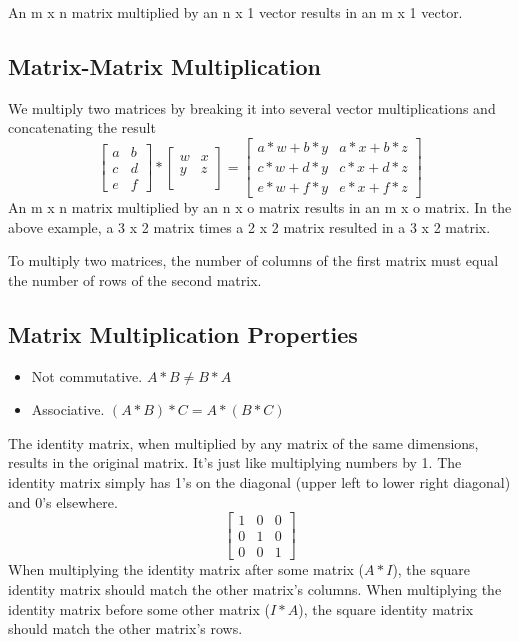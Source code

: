 An m x n matrix multiplied by an n x 1 vector results in an m x 1 vector.

\subsection{Matrix-Matrix Multiplication}
We multiply two matrices by breaking it into several vector multiplications and concatenating the result
\[
\begin{bmatrix}  a & b \\   c & d \\   e & f \end{bmatrix} *\begin{bmatrix}  w & x \\   y & z \\  \end{bmatrix} =\begin{bmatrix}  a*w + b*y & a*x + b*z \\   c*w + d*y & c*x + d*z \\   e*w + f*y & e*x + f*z\end{bmatrix}
\]
An m x n matrix multiplied by an n x o matrix results in an m x o matrix. In the above example, a 3 x 2 matrix times a 2 x 2 matrix resulted in a 3 x 2 matrix.

To multiply two matrices, the number of columns of the first matrix must equal the number of rows of the second matrix.
\subsection{Matrix Multiplication Properties}
\begin{itemize}
	\item Not commutative. $A\ast B\neq B\ast A$
	\item Associative. $(A\ast B)\ast C=A\ast (B\ast C)$
\end{itemize}
The identity matrix, when multiplied by any matrix of the same dimensions, results in the original matrix. It's just like multiplying numbers by 1. The identity matrix simply has 1's on the diagonal (upper left to lower right diagonal) and 0's elsewhere.
\[
\begin{bmatrix}
1 & 0 & 0 \\
0 & 1 & 0 \\
0 & 0 & 1 
\end{bmatrix}
\]
When multiplying the identity matrix after some matrix ($A\ast I$), the square identity matrix should match the other matrix's columns. When multiplying the identity matrix before some other matrix ($I\ast A$), the square identity matrix should match the other matrix's rows.
